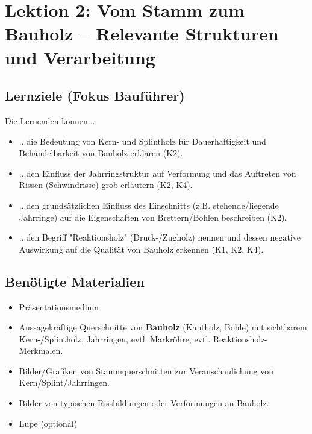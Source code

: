 \documentclass[12pt, a4paper]{article}
\begin{document}
\newpage

\section{Lektion 2: Vom Stamm zum Bauholz – Relevante Strukturen und Verarbeitung}
\subsection{Lernziele (Fokus Bauführer)}
Die Lernenden können...
\begin{itemize}
    \item ...die Bedeutung von Kern- und Splintholz für Dauerhaftigkeit und Behandelbarkeit von Bauholz erklären (K2).
    \item ...den Einfluss der Jahrringstruktur auf Verformung und das Auftreten von Rissen (Schwindrisse) grob erläutern (K2, K4).
    \item ...den grundsätzlichen Einfluss des Einschnitts (z.B. stehende/liegende Jahrringe) auf die Eigenschaften von Brettern/Bohlen beschreiben (K2).
    \item ...den Begriff "Reaktionsholz" (Druck-/Zugholz) nennen und dessen negative Auswirkung auf die Qualität von Bauholz erkennen (K1, K2, K4).
\end{itemize}

\subsection{Benötigte Materialien}
\begin{itemize}
    \item Präsentationsmedium
    \item Aussagekräftige Querschnitte von \textbf{Bauholz} (Kantholz, Bohle) mit sichtbarem Kern-/Splintholz, Jahrringen, evtl. Markröhre, evtl. Reaktionsholz-Merkmalen.
    \item Bilder/Grafiken von Stammquerschnitten zur Veranschaulichung von Kern/Splint/Jahrringen.
    \item Bilder von typischen Rissbildungen oder Verformungen an Bauholz.
    \item Lupe (optional)
\end{itemize}
\end{document}
